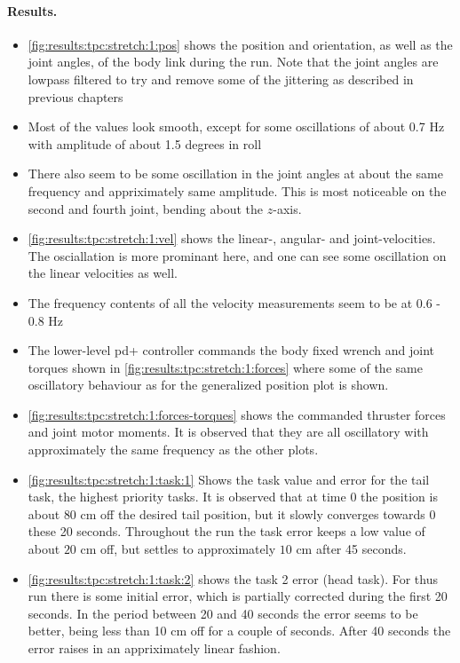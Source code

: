 \iffalse
\paragraph{Results.}
\begin{itemize}
    \item \autoref{fig:results:tpc:stretch:1:pos} shows the position and orientation, as well as the joint angles, of the body link during the run. Note that the joint angles are lowpass filtered to try and remove some of the jittering as described in previous chapters 
    \item Most of the values look smooth, except for some oscillations of about 0.7 Hz with amplitude of about 1.5 degrees in roll
    \item There also seem to be some oscillation in the joint angles at about the same frequency and appriximately same amplitude. This is most noticeable on the second and fourth joint, bending about the \(z\)-axis.
    \item \autoref{fig:results:tpc:stretch:1:vel} shows the linear-, angular- and joint-velocities. The osciallation is more prominant here, and one can see some oscillation on the linear velocities as well.
    \item The frequency contents of all the velocity measurements seem to be at 0.6 - 0.8 Hz
    \item The lower-level \gls{pd+} controller commands the body fixed wrench and joint torques shown in \autoref{fig:results:tpc:stretch:1:forces} where some of the same oscillatory behaviour as for the generalized position plot is shown.
    \item \autoref{fig:results:tpc:stretch:1:forces-torques} shows the commanded thruster forces and joint motor moments. It is observed that they
        are all oscillatory with approximately the same frequency as the other plots.
    \item \autoref{fig:results:tpc:stretch:1:task:1} Shows the task value and error for the tail task, the highest priority tasks. It is observed
        that at time 0 the position is about \(80\) cm off the desired tail position, but it slowly converges towards 0 these 20 seconds. Throughout the run the task error keeps a low value of about \(20\) cm off, but settles to approximately \(10\) cm after 45 seconds.
    \item \autoref{fig:results:tpc:stretch:1:task:2} shows the task 2 error (head task). For thus run there is some initial error, which is partially corrected during the first 20 seconds. In the period between 20 and 40 seconds the error seems to be better, being less than 10 cm off for a couple of seconds. After 40 seconds the error raises in an appriximately linear fashion.

\end{itemize}
